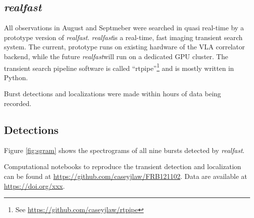 \documentclass{emulateapj}
\newcommand{\rf}{\emph{realfast}}
\begin{document}
\subsection{\rf}

All observations in August and Septmeber were searched in quasi real-time by a prototype version of \rf. \rf is a real-time, fast imaging transient search system. The current, prototype runs on existing hardware of the VLA correlator backend, while the future \rf will run on a dedicated GPU cluster. The transient search pipeline software is called ``rtpipe''\footnote{See \url{https://github.com/caseyjlaw/rtpipe}} and is mostly written in Python.

Burst detections and localizations were made within hours of data being recorded.

\subsection{Detections}

Figure \ref{fig:sgram} shows the spectrograms of all nine bursts detected by \rf.

Computational notebooks to reproduce the transient detection and localization can be found at \url{https://github.com/caseyjlaw/FRB121102}. Data are available at \url{https://doi.org/xxx}.
\end{document}
